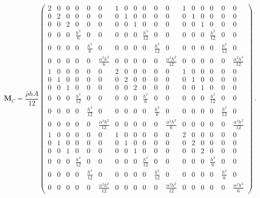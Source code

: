 \begin{equation} 
\mathbf{M}_C
=
\frac{\bar{\rho} h A}{12}
\begin{pmatrix}
2 & 0 & 0 & 0 & 0 & 0 & %
1 & 0 & 0 & 0 & 0 & 0 & 
1 & 0 & 0 & 0 & 0 & 0 
\\
0 & 2 & 0 & 0 & 0 & 0 & 
0 & 1 & 0 & 0 & 0 & 0 & 
0 & 1 & 0 & 0 & 0 & 0 
\\
0 & 0 & 2 & 0 & 0 & 0 & 
0 & 0 & 1 & 0 & 0 & 0 & 
0 & 0 & 1 & 0 & 0 & 0 
\\
0 & 0 & 0 & \frac{h^2}{6} & 0 & 0 & 
0 & 0 & 0 & \frac{h^2}{12} & 0 & 0 & 
0 & 0 & 0 & \frac{h^2}{12} & 0 & 0 
\\
0 & 0 & 0 & 0 & \frac{h^2}{6} & 0 & 
0 & 0 & 0 & 0 & \frac{h^2}{12} & 0 & 
0 & 0 & 0 & 0 & \frac{h^2}{12} & 0  
\\
0 & 0 & 0 & 0 & 0 & \frac{\alpha^2h^2}{6}  & 
0 & 0 & 0 & 0 & 0 & \frac{\alpha^2h^2}{12} & 
0 & 0 & 0 & 0 & 0 & \frac{\alpha^2h^2}{12}  
\\
1 & 0 & 0 & 0 & 0 & 0 & %
2 & 0 & 0 & 0 & 0 & 0 & 
1 & 0 & 0 & 0 & 0 & 0 
\\
0 & 1 & 0 & 0 & 0 & 0 & 
0 & 2 & 0 & 0 & 0 & 0 & 
0 & 1 & 0 & 0 & 0 & 0 
\\
0 & 0 & 1 & 0 & 0 & 0 & 
0 & 0 & 2 & 0 & 0 & 0 & 
0 & 0 & 1 & 0 & 0 & 0 
\\
0 & 0 & 0 & \frac{h^2}{12} & 0 & 0 & 
0 & 0 & 0 & \frac{h^2}{6} & 0 & 0 & 
0 & 0 & 0 & \frac{h^2}{12} & 0 & 0 
\\
0 & 0 & 0 & 0 & \frac{h^2}{12} & 0 & 
0 & 0 & 0 & 0 & \frac{h^2}{6} & 0 & 
0 & 0 & 0 & 0 & \frac{h^2}{12} & 0  
\\
0 & 0 & 0 & 0 & 0 & \frac{\alpha^2h^2}{12}  & 
0 & 0 & 0 & 0 & 0 & \frac{\alpha^2h^2}{6} & 
0 & 0 & 0 & 0 & 0 & \frac{\alpha^2h^2}{12}  
\\
1 & 0 & 0 & 0 & 0 & 0 & %
1 & 0 & 0 & 0 & 0 & 0 & 
2 & 0 & 0 & 0 & 0 & 0 
\\
0 & 1 & 0 & 0 & 0 & 0 & 
0 & 1 & 0 & 0 & 0 & 0 & 
0 & 2 & 0 & 0 & 0 & 0 
\\
0 & 0 & 1 & 0 & 0 & 0 & 
0 & 0 & 1 & 0 & 0 & 0 & 
0 & 0 & 2 & 0 & 0 & 0 
\\
0 & 0 & 0 & \frac{h^2}{12} & 0 & 0 & 
0 & 0 & 0 & \frac{h^2}{12} & 0 & 0 & 
0 & 0 & 0 & \frac{h^2}{6} & 0 & 0 
\\
0 & 0 & 0 & 0 & \frac{h^2}{12} & 0 & 
0 & 0 & 0 & 0 & \frac{h^2}{12} & 0 & 
0 & 0 & 0 & 0 & \frac{h^2}{6} & 0  
\\
0 & 0 & 0 & 0 & 0 & \frac{\alpha^2h^2}{12}  & 
0 & 0 & 0 & 0 & 0 & \frac{\alpha^2h^2}{12} & 
0 & 0 & 0 & 0 & 0 & \frac{\alpha^2h^2}{6}  
\end{pmatrix}
\label{eqt17_11}\ .
\end{equation}


